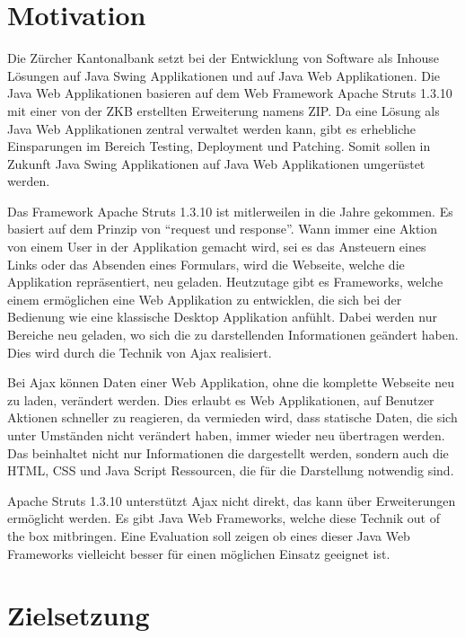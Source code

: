   \section{Motivation}
  
  Die Zürcher Kantonalbank setzt bei der Entwicklung von Software als Inhouse
  Lösungen auf Java Swing Applikationen und auf Java Web Applikationen. Die
  Java Web Applikationen basieren auf dem Web Framework Apache Struts 1.3.10
  mit einer von der ZKB erstellten Erweiterung namens \ac{ZIP}. Da eine Lösung
  als Java Web Applikationen zentral verwaltet werden kann, gibt es erhebliche
  Einsparungen im Bereich Testing, Deployment und Patching. Somit sollen in
  Zukunft Java Swing Applikationen auf Java Web Applikationen umgerüstet
  werden.
  
  Das Framework Apache Struts 1.3.10 ist mitlerweilen in die Jahre gekommen. Es
  basiert auf dem Prinzip von ``request und response''. Wann immer eine Aktion
  von einem User in der Applikation gemacht wird, sei es das Ansteuern eines
  Links oder das Absenden eines Formulars, wird die Webseite, welche die
  Applikation repräsentiert, neu geladen. Heutzutage gibt es Frameworks, welche
  einem ermöglichen eine Web Applikation zu entwicklen, die sich bei der
  Bedienung wie eine klassische Desktop Applikation anfühlt. Dabei werden
  nur Bereiche neu geladen, wo sich die zu darstellenden Informationen geändert
  haben. Dies wird durch die Technik von \ac{Ajax} realisiert.
  
  Bei \ac{Ajax} können Daten einer Web Applikation, ohne die komplette Webseite
  neu zu laden, verändert werden. Dies erlaubt es Web Applikationen, auf
  Benutzer Aktionen schneller zu reagieren, da vermieden wird, dass statische
  Daten, die sich unter Umständen nicht verändert haben, immer wieder neu
  übertragen werden. Das beinhaltet nicht nur Informationen die dargestellt
  werden, sondern auch die \ac{HTML}, \ac{CSS} und Java Script Ressourcen, die
  für die Darstellung notwendig sind.
  
  Apache Struts 1.3.10 unterstützt \ac{Ajax} nicht direkt, das kann über
  Erweiterungen ermöglicht werden. Es gibt Java Web Frameworks, welche diese
  Technik out of the box mitbringen. Eine Evaluation soll zeigen ob eines dieser
  Java Web Frameworks vielleicht besser für einen möglichen Einsatz geeignet
  ist.
  
  \section{Zielsetzung}
  
